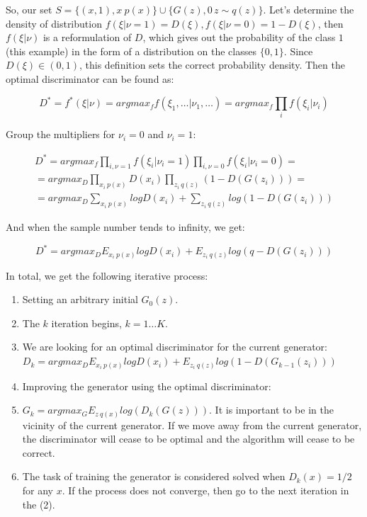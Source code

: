So, our set $S=\{(x, 1), x~p(x)\} \cup \{G(z), 0\, z \sim q(z)\}$. Let's determine the density of distribution $f(\xi|\nu=1) = D(\xi), f(\xi|\nu=0)=1-D(\xi)$, then $f(\xi|\nu)$ is a reformulation of $D$, which gives out the probability of the class $1$ (this example) in the form of a distribution on the classes $\{0, 1\}$. Since $D(\xi) \in (0, 1)$, this definition sets the correct probability density. Then the optimal discriminator can be found as:

\begin{equation}
    \label{eq:gan-1}
    D^* = f^*(\xi|\nu) = argmax_f f(\xi_1, \dots | \nu_1, \dots) = argmax_f \prod_i f(\xi_i|\nu_i)
\end{equation}

Group the multipliers for $\nu_i=0$ and $\nu_i=1$:

\begin{equation}
    \label{eq:gan-2}
    \begin{split}
        D^* = argmax_f \prod_{i, \nu=1} f(\xi_i|\nu_i=1) \prod_{i, \nu=0} f(\xi_i|\nu_i=0) = \\
        = argmax_D \prod_{x_i~p(x)} D(x_i) \prod_{z_i~q(z)} (1 - D(G(z_i))) = \\
        = argmax_D \sum_{x_i~p(x)} log D(x_i) + \sum_{z_i~q(z)} log (1 - D(G(z_i)))
    \end{split}
\end{equation}

And when the sample number tends to infinity, we get:

\begin{equation}
    \label{eq:gan-3}
    D^* = argmax_D E_{x_i~p(x)} log D(x_i) + E_{z_i~q(z)} log (q - D(G(z_i)))
\end{equation}

In total, we get the following iterative process:

\begin{enumerate}
    \item Setting an arbitrary initial $G_0(z)$.
    \item The $k$ iteration begins, $k=1 \dots K$.
    \item We are looking for an optimal discriminator for the current generator: \\
          $D_k = argmax_D E_{x_i~p(x)} log D(x_i) + E_{z_i~q(z)} log(1 - D(G_{k-1}(z_i)))$
    \item Improving the generator using the optimal discriminator:

    \item $G_k = argmax_G E_{z~q(x)} log(D_k(G(z)))$. It is important to be in the vicinity of the current generator. If we move away from the current generator, the discriminator will cease to be optimal and the algorithm will cease to be correct.
    \item The task of training the generator is considered solved when $D_k(x) = 1/2$ for any $x$. If the process does not converge, then go to the next iteration in the (2).
\end{enumerate}

